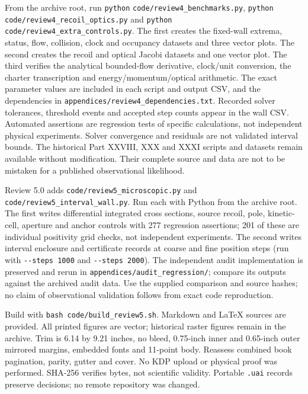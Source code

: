 \documentclass[
  11pt,
  twoside]{article}
\begin{document}
From the archive root, run \texttt{python}
\nolinkurl{code/review4_benchmarks.py}, \texttt{python}
\nolinkurl{code/review4_recoil_optics.py} and \texttt{python}
\nolinkurl{code/review4_extra_controls.py}. The first creates the
fixed-wall extrema, status, flow, collision, clock and occupancy
datasets and three vector plots. The second creates the recoil and
optical Jacobi datasets and one vector plot. The third verifies the
analytical bounded-flow derivative, clock/unit conversion, the charter
transcription and energy/momentum/optical arithmetic. The exact
parameter values are included in each script and output CSV, and the
dependencies in \nolinkurl{appendices/review4_dependencies.txt}.
Recorded solver tolerances, threshold events and accepted step counts
appear in the wall CSV. Automated assertions are regression tests of
specific calculations, not independent physical experiments. Solver
convergence and residuals are not validated interval bounds. The
historical Part XXVIII, XXX and XXXI scripts and datasets remain
available without modification. Their complete source and data are not
to be mistaken for a published observational likelihood.

Review 5.0 adds \nolinkurl{code/review5_microscopic.py} and
\nolinkurl{code/review5_interval_wall.py}. Run each with Python from the
archive root. The first writes differential integrated cross sections,
source recoil, pole, kinetic-cell, aperture and anchor controls with 277
regression assertions; 201 of these are individual positivity grid
checks, not independent experiments. The second writes interval
enclosure and certificate records at coarse and fine position steps (run
with \texttt{-\/-steps\ 1000} and \texttt{-\/-steps\ 2000}). The
independent audit implementation is preserved and rerun in
\nolinkurl{appendices/audit_regression/}; compare its outputs against
the archived audit data. Use the supplied comparison and source hashes;
no claim of observational validation follows from exact code
reproduction.

Build with \nolinkurl{bash code/build_review5.sh}. Markdown and LaTeX
sources are provided. All printed figures are vector; historical raster
figures remain in the archive. Trim is 6.14 by 9.21 inches, no bleed,
0.75-inch inner and 0.65-inch outer mirrored margins, embedded fonts and
11-point body. Reassess combined book pagination, parity, gutter and
cover. No KDP upload or physical proof was performed. SHA-256 verifies
bytes, not scientific validity. Portable \texttt{.uai} records preserve
decisions; no remote repository was changed.
\end{document}
